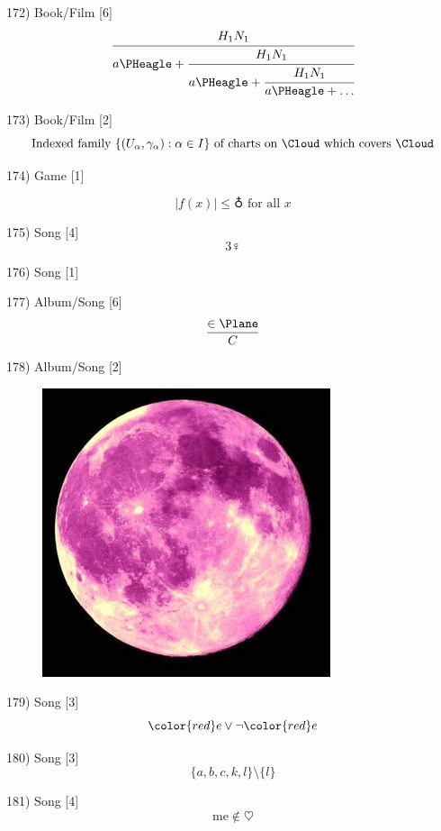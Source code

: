 \documentclass[10pt]{article}
\begin{document}
	
	172) Book/Film [6]
	\[
	\cfrac{H_1N_1}{a\text{\PHeagle} + \cfrac{H_1N_1}{a\text{\PHeagle} + \cfrac{H_1N_1}{a\text{\PHeagle} + \ldots}}}
	\]
	
	173) Book/Film [2]
	\[		
		\text{Indexed family } \{(U_\alpha, \gamma_\alpha) : \alpha \in I\} \text{ of charts on \Cloud\ which covers \Cloud} 
	\]
	
	174) Game [1]
	
	\[
	|f(x)|\leq \earth \text{ for all } x
	\]
	
	175) Song [4]
	\[
	3\female
	\]
	
	176) Song [1]
	\begin{figure}[htbp!]
	\centering
	\end{figure}

	177) Album/Song [6]
	\[
	\frac{\in \text{\Plane}}{C}
	\]
	
	178) Album/Song [2]
	\begin{figure}[htbp!]
	\centering
		\includegraphics[scale=0.4]{./pinkmoon.jpg}
	\end{figure}
	
	179)  Song [3]
	\[
	{\color{red} e} \lor \lnot {\color{red} e}
	\]
	
	180) Song [3]
	\[
		\{a,b, c, k,l\} \setminus \{l\}
	\]
	
	181) Song [4]
	\[
		\text{me} \notin \heartsuit
	\]
\end{document}

